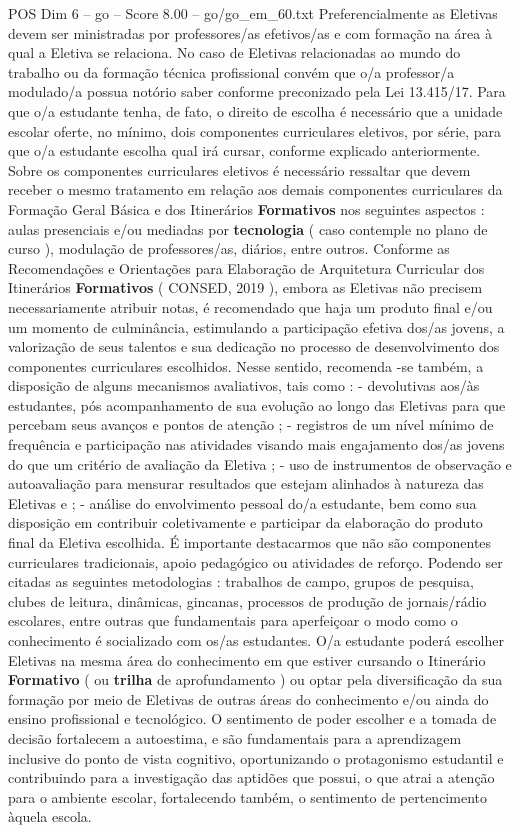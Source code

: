 \begin{textsample}{POS Dim 6 – go – Score 8.00 – go/go\_em\_60.txt}
Preferencialmente as Eletivas devem ser ministradas por professores/as efetivos/as e com formação na área à qual a Eletiva se relaciona.
No caso de Eletivas relacionadas ao mundo do trabalho ou da formação técnica profissional convém que o/a professor/a modulado/a possua notório saber conforme preconizado pela Lei 13.415/17.
Para que o/a estudante tenha, de fato, o direito de escolha é necessário que a unidade escolar oferte, no mínimo, dois componentes curriculares eletivos, por série, para que o/a estudante escolha qual irá cursar, conforme explicado anteriormente.
Sobre os componentes curriculares eletivos é necessário ressaltar que devem receber o mesmo tratamento em relação aos demais componentes curriculares da Formação Geral Básica e dos Itinerários \textbf{Formativos} nos seguintes aspectos : aulas presenciais e/ou mediadas por \textbf{tecnologia} ( caso contemple no plano de curso ), modulação de professores/as, diários, entre outros.
Conforme as Recomendações e Orientações para Elaboração de Arquitetura Curricular dos Itinerários \textbf{Formativos} ( CONSED, 2019 ), embora as Eletivas não precisem necessariamente atribuir notas, é recomendado que haja um produto final e/ou um momento de culminância, estimulando a participação efetiva dos/as jovens, a valorização de seus talentos e sua dedicação no processo de desenvolvimento dos componentes curriculares escolhidos.
Nesse sentido, recomenda -se também, a disposição de alguns mecanismos avaliativos, tais como : - devolutivas aos/às estudantes, pós acompanhamento de sua evolução ao longo das Eletivas para que percebam seus avanços e pontos de atenção ; - registros de um nível mínimo de frequência e participação nas atividades visando mais engajamento dos/as jovens do que um critério de avaliação da Eletiva ; - uso de instrumentos de observação e autoavaliação para mensurar resultados que estejam alinhados à natureza das Eletivas e ; - análise do envolvimento pessoal do/a estudante, bem como sua disposição em contribuir coletivamente e participar da elaboração do produto final da Eletiva escolhida.
É importante destacarmos que não são componentes curriculares tradicionais, apoio pedagógico ou atividades de reforço.
Podendo ser citadas as seguintes metodologias : trabalhos de campo, grupos de pesquisa, clubes de leitura, dinâmicas, gincanas, processos de produção de jornais/rádio escolares, entre outras que fundamentais para aperfeiçoar o modo como o conhecimento é socializado com os/as estudantes.
O/a estudante poderá escolher Eletivas na mesma área do conhecimento em que estiver cursando o Itinerário \textbf{Formativo} ( ou \textbf{trilha} de aprofundamento ) ou optar pela diversificação da sua formação por meio de Eletivas de outras áreas do conhecimento e/ou ainda do ensino profissional e tecnológico.
O sentimento de poder escolher e a tomada de decisão fortalecem a autoestima, e são fundamentais para a aprendizagem inclusive do ponto de vista cognitivo, oportunizando o protagonismo estudantil e contribuindo para a investigação das aptidões que possui, o que atrai a atenção para o ambiente escolar, fortalecendo também, o sentimento de pertencimento àquela escola.

\end{textsample}
